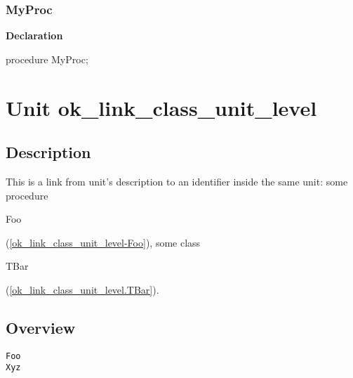\documentclass{report}
\newif\ifpdf
\begin{document}
\subsection*{MyProc}
\fi
\label{ok_links_2-MyProc}
\begin{list}{}{
\setlength{\itemindent}{0cm}
\setlength{\listparindent}{0cm}
\setlength{\leftmargin}{\evensidemargin}
\addtolength{\leftmargin}{\tmplength}
\settowidth{\labelsep}{X}
\addtolength{\leftmargin}{\labelsep}
\setlength{\labelwidth}{\tmplength}
}
\item[\textbf{Declaration}\hfill]
\ifpdf
\begin{flushleft}
\fi
\begin{ttfamily}
procedure MyProc;\end{ttfamily}

\ifpdf
\end{flushleft}
\fi

\end{list}
\chapter{Unit ok{\_}link{\_}class{\_}unit{\_}level}
\label{ok_link_class_unit_level}
\section{Description}
This is a link from unit's description to an identifier inside the same unit: some procedure \begin{ttfamily}Foo\end{ttfamily}(\ref{ok_link_class_unit_level-Foo}), some class \begin{ttfamily}TBar\end{ttfamily}(\ref{ok_link_class_unit_level.TBar}).
\section{Overview}
\begin{description}
\item[\texttt{\begin{ttfamily}TBar\end{ttfamily} Class}]
\end{description}
\begin{description}
\item[\texttt{Foo}]
\item[\texttt{Xyz}]
\end{description}
\end{document}

